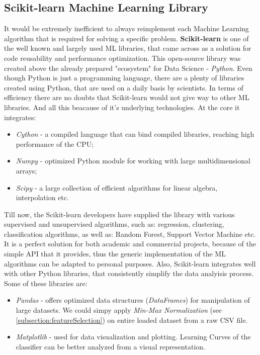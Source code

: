 \subsection{Scikit-learn Machine Learning Library}
It would be extremely inefficient to always reimplement each Machine Learning algorithm that is required for solving a specific problem. \textbf{Scikit-learn} is one of the well known and largely used ML libraries, that came across as a solution for code reusability and performance optimization. This open-source library was created above the already prepared "ecosystem" for Data Science - \textit{Python}. Even though Python is just a programming language, there are a plenty of libraries created using Python, that are used on a daily basis by scientists. In terms of efficiency there are no doubts that Scikit-learn would not give way to other ML libraries. And all this beacause of it's underlying technologies. At the core it integrates:

\begin{itemize}
	\item \textit{Cython} - a compiled language that can bind compiled libraries, reaching high performance of the CPU;
	\item \textit{Numpy} - optimized Python module for working with large multidimensional arrays;
	\item \textit{Scipy} - a large collection of efficient algorithms for linear algebra, interpolation etc.
\end{itemize}

Till now, the Scikit-learn developers have supplied the library with various supervised and unsupervised algorithms, such as: regression, clustering, classification algorithms, as well as: Random Forest, Support Vector Machine etc. It is a perfect solution for both academic and commercial projects, because of the simple API that it provides, thus the generic implementation of the ML algorithms can be adapted to personal purposes. Also, Scikit-learn integrates well with other Python libraries, that consistently simplify the data analyisis process. Some of these libraries are: 

\begin{itemize}
	\item \textit{Pandas} - offers optimized data structures (\textit{DataFrames}) for manipulation of large datasets. We could simpy apply \textit{Min-Max Normalization} (see \ref{subsection:featureSelection}) on entire loaded dataset from a raw CSV file.
	\item \textit{Matplotlib} - used for data visualization and plotting. Learning Curves of the classifier can be better analyzed from a visual representation.
\end{itemize}


